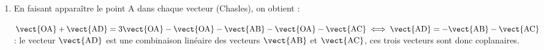 \begin{enumerate}
La droite $\Delta$ a pour vecteur directeur $\delta\begin{pmatrix}2\\1\\-1\end{pmatrix}$

Soit $\mathcal{P}$ le plan dont on cherche une équation.

$M(x~;~y~;~z) \in \mathcal{P} \iff \vect{\text{C}M} \cdot \delta = 0 \iff 2(x - 0) + 1(y - 1) -1(z - 2) = 0 \iff$

$ 2x + y - 1 - z + 2 = 0 \iff 2x + y - z + 1 = 0$.
\item 







En faisant apparaître le point A dans chaque vecteur (Chasles), on obtient :

$\vect{\text{OA}} + \vect{\text{AD}}  = 3\vect{\text{OA}}  - \vect{\text{OA}}  - \vect{\text{AB}}  - \vect{\text{OA}}  - \vect{\text{AC}} \iff \vect{\text{AD}}  = - \vect{\text{AB}} - \vect{\text{AC}} $ : le vecteur $\vect{\text{AD}}$ est une combinaison linéaire des vecteurs $\vect{\text{AB}}$ et $\vect{\text{AC}}$, ces trois vecteurs sont donc coplanaires.
\end{enumerate}

\bigskip
